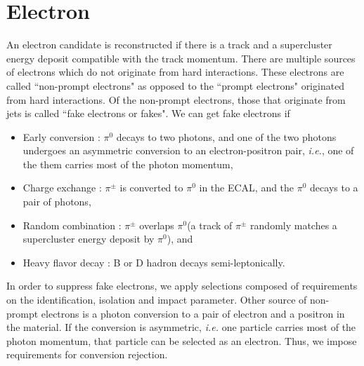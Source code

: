\section{ Electron }
\label{sec:electron}

An electron candidate is reconstructed if there is a track and a supercluster energy 
deposit compatible with the track momentum. There are multiple sources of 
electrons which do not originate from hard interactions. These electrons 
are called ``non-prompt electrons" as opposed to the 
``prompt electrons" originated from hard interactions. 
Of the non-prompt electrons, those that originate from jets is called ``fake electrons or fakes".
We can get fake electrons if  
\begin{itemize}
\item Early conversion : $\pi^0$ decays to two photons, and one of the two photons
      undergoes an asymmetric conversion to an electron-positron pair, \textit{i.e.}, 
      one of the them carries most of the photon momentum,
\item Charge exchange : $\pi^\pm$ is converted to $\pi^0$ in the ECAL, 
      and the $\pi^0$ decays to a pair of photons,
\item Random combination : $\pi^\pm$ overlaps $\pi^0$(a track of $\pi^\pm$ 
      randomly matches a supercluster energy deposit by $\pi^0$), and 
\item Heavy flavor decay : B or D hadron decays semi-leptonically.  
\end{itemize}
In order to suppress fake electrons, we apply selections composed of 
requirements on the identification,
isolation and impact parameter.  
Other source of non-prompt electrons is a photon conversion 
to a pair of electron and a positron 
in the material. If the conversion is asymmetric, \textit{i.e.} one particle carries 
most of the photon momentum, that particle can be selected as an electron. 
Thus, we impose requirements for conversion rejection.

